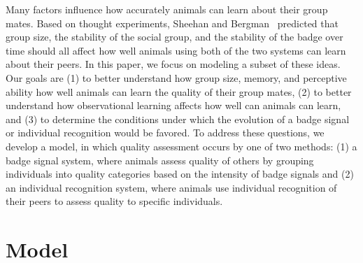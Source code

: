 Many factors influence how accurately animals can learn about their group mates. Based on  thought experiments, Sheehan and Bergman~\cite{sheehan2016evotradeoff} predicted that group size, the stability of the social group, and the stability of the badge over time should all affect how well animals using both of the two systems can learn about their peers. In this paper, we focus on modeling a subset of these ideas. Our goals are (1) to better understand how group size, memory, and perceptive ability how well animals can learn the quality of their group mates, (2) to better understand how observational learning affects how well can animals can learn, and (3) to determine the conditions under which the evolution of a badge signal or individual recognition would be favored. To address these questions, we develop a model, in which quality assessment occurs by one of two methods: (1) a badge signal system, where animals assess quality of others by grouping individuals into quality categories based on the intensity of badge signals and (2) an individual recognition system, where animals use individual recognition of their peers to assess quality to specific individuals.  


\section*{Model} 


